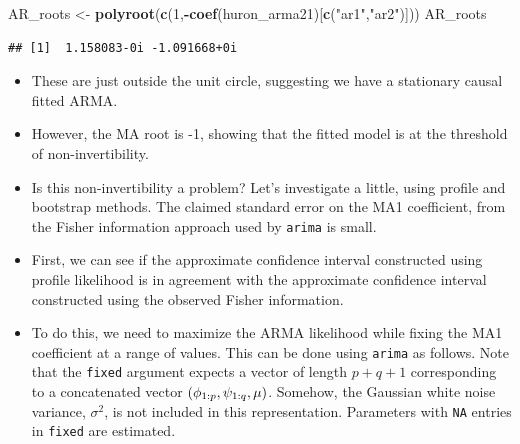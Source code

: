 \documentclass[]{article}
\newenvironment{Shaded}{\begin{snugshade}}{\end{snugshade}}
\newcommand{\KeywordTok}[1]{\textcolor[rgb]{0.13,0.29,0.53}{\textbf{#1}}}
\newcommand{\DecValTok}[1]{\textcolor[rgb]{0.00,0.00,0.81}{#1}}
\newcommand{\StringTok}[1]{\textcolor[rgb]{0.31,0.60,0.02}{#1}}
\newcommand{\OperatorTok}[1]{\textcolor[rgb]{0.81,0.36,0.00}{\textbf{#1}}}
\newcommand{\NormalTok}[1]{#1}
\begin{document}
\begin{Shaded}
\begin{Highlighting}[]
\NormalTok{AR_roots <-}\StringTok{ }\KeywordTok{polyroot}\NormalTok{(}\KeywordTok{c}\NormalTok{(}\DecValTok{1}\NormalTok{,}\OperatorTok{-}\KeywordTok{coef}\NormalTok{(huron_arma21)[}\KeywordTok{c}\NormalTok{(}\StringTok{"ar1"}\NormalTok{,}\StringTok{"ar2"}\NormalTok{)]))}
\NormalTok{AR_roots}
\end{Highlighting}
\end{Shaded}

\begin{verbatim}
## [1]  1.158083-0i -1.091668+0i
\end{verbatim}

\begin{itemize}
\item
  These are just outside the unit circle, suggesting we have a
  stationary causal fitted ARMA.
\item
  However, the MA root is -1, showing that the fitted model is at the
  threshold of non-invertibility.
\item
  Is this non-invertibility a problem? Let's investigate a little, using
  profile and bootstrap methods. The claimed standard error on the MA1
  coefficient, from the Fisher information approach used by
  \texttt{arima} is small.
\item
  First, we can see if the approximate confidence interval constructed
  using profile likelihood is in agreement with the approximate
  confidence interval constructed using the observed Fisher information.
\item
  To do this, we need to maximize the ARMA likelihood while fixing the
  MA1 coefficient at a range of values. This can be done using
  \texttt{arima} as follows. Note that the \texttt{fixed} argument
  expects a vector of length \(p+q+1\) corresponding to a concatenated
  vector \((\phi_{1:p},\psi_{1:q}, \mu)\). Somehow, the Gaussian white
  noise variance, \(\sigma^2\), is not included in this representation.
  Parameters with \texttt{NA} entries in \texttt{fixed} are estimated.
\end{itemize}
\end{document}
